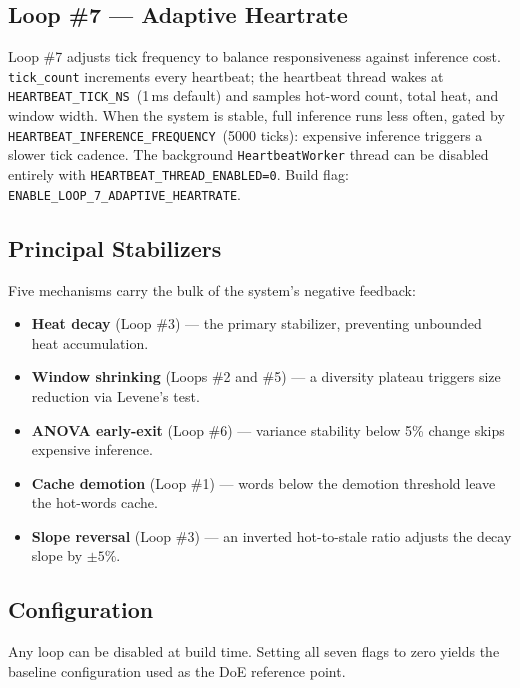 \subsection{Loop \#7 --- Adaptive Heartrate}

Loop \#7 adjusts tick frequency to balance responsiveness against inference cost.
\texttt{tick\_count} increments every heartbeat; the heartbeat thread wakes at
\texttt{HEARTBEAT\_TICK\_NS}~(1\,ms default) and samples hot-word count, total
heat, and window width. When the system is stable, full inference runs less
often, gated by \texttt{HEARTBEAT\_INFERENCE\_FREQUENCY}~(5000 ticks): expensive
inference triggers a slower tick cadence. The background \texttt{HeartbeatWorker}
thread can be disabled entirely with \texttt{HEARTBEAT\_THREAD\_ENABLED=0}.
Build flag: \texttt{ENABLE\_LOOP\_7\_ADAPTIVE\_HEARTRATE}.

\subsection{Principal Stabilizers}

Five mechanisms carry the bulk of the system's negative feedback:

\begin{itemize}
  \item \textbf{Heat decay} (Loop \#3) --- the primary stabilizer, preventing
        unbounded heat accumulation.
  \item \textbf{Window shrinking} (Loops \#2 and \#5) --- a diversity plateau
        triggers size reduction via Levene's test.
  \item \textbf{ANOVA early-exit} (Loop \#6) --- variance stability below 5\%
        change skips expensive inference.
  \item \textbf{Cache demotion} (Loop \#1) --- words below the demotion
        threshold leave the hot-words cache.
  \item \textbf{Slope reversal} (Loop \#3) --- an inverted hot-to-stale ratio
        adjusts the decay slope by $\pm 5\%$.
\end{itemize}

\subsection{Configuration}

Any loop can be disabled at build time. Setting all seven flags to zero yields
the baseline configuration used as the DoE reference point.

